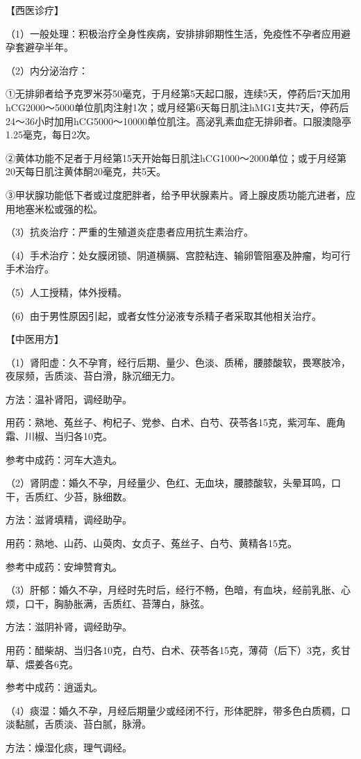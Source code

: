 \documentclass[12pt,UTF8]{ctexbook}
\begin{document}
【西医诊疗】

（1）一般处理：积极治疗全身性疾病，安排排卵期性生活，免疫性不孕者应用避孕套避孕半年。

（2）内分泌治疗：

①无排卵者给予克罗米芬50毫克，于月经第5天起口服，连续5天，停药后7天加用hCG2000～5000单位肌肉注射1次；或月经第6天每日肌注hMG1支共7天，停药后24～36小时加用hCG5000～10000单位肌注。高泌乳素血症无排卵者。口服澳隐亭1.25毫克，每日2次。

②黄体功能不足者于月经第15天开始每日肌注hCG1000～2000单位；或于月经第20天每日肌注黄体酮20毫克，共5天。

③甲状腺功能低下者或过度肥胖者，给予甲状腺素片。肾上腺皮质功能亢进者，应用地塞米松或强的松。

（3）抗炎治疗：严重的生殖道炎症患者应用抗生素治疗。

（4）手术治疗：处女膜闭锁、阴道横膈、宫腔粘连、输卵管阻塞及肿瘤，均可行手术治疗。

（5）人工授精，体外授精。

（6）由于男性原因引起，或者女性分泌液专杀精子者采取其他相关治疗。

【中医用方】

（1）肾阳虚：久不孕育，经行后期、量少、色淡、质稀，腰膝酸软，畏寒肢冷，夜尿频，舌质淡、苔白滑，脉沉细无力。

方法：温补肾阳，调经助孕。

用药：熟地、菟丝子、枸杞子、党参、白术、白芍、茯苓各15克，紫河车、鹿角霜、川椒、当归各10克。

参考中成药：河车大造丸。

（2）肾阴虚：婚久不孕，月经量少、色红、无血块，腰膝酸软，头晕耳鸣，口干，舌质红、少苔，脉细数。

方法：滋肾填精，调经助孕。

用药：熟地、山药、山萸肉、女贞子、菟丝子、白芍、黄精各15克。

参考中成药：安坤赞育丸。

（3）肝郁：婚久不孕，月经时先时后，经行不畅，色暗，有血块，经前乳胀、心烦，口干，胸胁胀满，舌质红、苔薄白，脉弦。

方法：滋阴补肾，调经助孕。

用药：醋柴胡、当归各10克，白芍、白术、茯苓各15克，薄荷（后下）3克，炙甘草、煨姜各6克。

参考中成药：逍遥丸。

（4）痰湿：婚久不孕，月经后期量少或经闭不行，形体肥胖，带多色白质稠，口淡黏腻，舌质淡、苔白腻，脉滑。

方法：燥湿化痰，理气调经。
\end{document}
